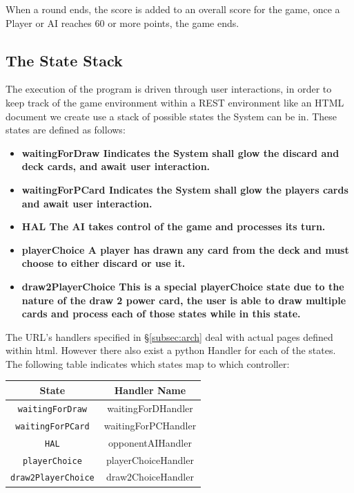 \documentclass[12pt]{IEEEtran}
\begin{document}
	When a round ends, the score is added to an overall score for the game, once a Player or AI reaches 60 or more points, the game ends. 

\subsection{The State Stack }
\label{subsec:urlhandstack}

	The execution of the program is driven through user interactions, in order to keep track of the game environment within a REST environment like an HTML document we create use a stack of possible states the System can be in. These states are defined as follows:
	\begin{itemize}
		\item \bfseries waitingForDraw \mdseries Iindicates the System shall glow the discard and deck cards, and await user  interaction.
		\item \bfseries waitingForPCard \mdseries Indicates the System shall glow the players cards and await user interaction.
		\item \bfseries HAL \mdseries The AI takes control of the game and processes its turn. 
		\item \bfseries playerChoice \mdseries A player has drawn any card from the deck and must choose to either discard or use it.
		\item \bfseries draw2PlayerChoice  \mdseries This is a special playerChoice state due to the nature of the draw 2 power card, the user is able to draw multiple cards and process each of those states while in this state.
	\end{itemize}

	The URL's handlers specified in \S\ref{subsec:arch} deal with actual pages defined within html. However there also exist a python Handler for each of the states. The following table indicates which states map to which controller:
	
	\begin{center}
		\begin{tabular}{| c | c |}\hline
			\multicolumn{1}{|c}{State} & \multicolumn{1}{c|}{ Handler Name }\\\hline
			\texttt{waitingForDraw} & waitingForDHandler\\\hline
			\texttt{waitingForPCard} & waitingForPCHandler\\\hline
			\texttt{HAL} & opponentAIHandler\\\hline
			\texttt{playerChoice} & playerChoiceHandler\\\hline
			\texttt{draw2PlayerChoice} & draw2ChoiceHandler\\\hline
		\end{tabular}
	\end{center}
\end{document}
